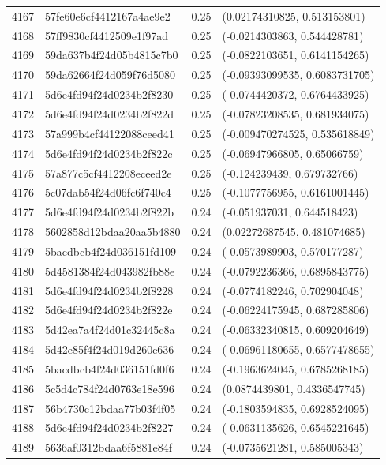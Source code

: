\begin{table}[ht]
\begin{tabular}{rlrl}
  4167 & 57fe60e6cf4412167a4ae9e2 & 0.25 & (0.02174310825, 0.513153801) \\ 
  4168 & 57ff9830cf4412509e1f97ad & 0.25 & (-0.0214303863, 0.544428781) \\ 
  4169 & 59da637b4f24d05b4815c7b0 & 0.25 & (-0.0822103651, 0.6141154265) \\ 
  4170 & 59da62664f24d059f76d5080 & 0.25 & (-0.09393099535, 0.6083731705) \\ 
  4171 & 5d6e4fd94f24d0234b2f8230 & 0.25 & (-0.0744420372, 0.6764433925) \\ 
  4172 & 5d6e4fd94f24d0234b2f822d & 0.25 & (-0.07823208535, 0.681934075) \\ 
  4173 & 57a999b4cf44122088ceed41 & 0.25 & (-0.009470274525, 0.535618849) \\ 
  4174 & 5d6e4fd94f24d0234b2f822c & 0.25 & (-0.06947966805, 0.65066759) \\ 
  4175 & 57a877c5cf4412208eceed2e & 0.25 & (-0.124239439, 0.679732766) \\ 
  4176 & 5c07dab54f24d06fc6f740c4 & 0.25 & (-0.1077756955, 0.6161001445) \\ 
  4177 & 5d6e4fd94f24d0234b2f822b & 0.24 & (-0.051937031, 0.644518423) \\ 
  4178 & 5602858d12bdaa20aa5b4880 & 0.24 & (0.02272687545, 0.481074685) \\ 
  4179 & 5bacdbcb4f24d036151fd109 & 0.24 & (-0.0573989903, 0.570177287) \\ 
  4180 & 5d4581384f24d043982fb88e & 0.24 & (-0.0792236366, 0.6895843775) \\ 
  4181 & 5d6e4fd94f24d0234b2f8228 & 0.24 & (-0.0774182246, 0.702904048) \\ 
  4182 & 5d6e4fd94f24d0234b2f822e & 0.24 & (-0.06224175945, 0.687285806) \\ 
  4183 & 5d42ea7a4f24d01c32445c8a & 0.24 & (-0.06332340815, 0.609204649) \\ 
  4184 & 5d42e85f4f24d019d260e636 & 0.24 & (-0.06961180655, 0.6577478655) \\ 
  4185 & 5bacdbcb4f24d036151fd0f6 & 0.24 & (-0.1963624045, 0.6785268185) \\ 
  4186 & 5c5d4c784f24d0763e18e596 & 0.24 & (0.0874439801, 0.4336547745) \\ 
  4187 & 56b4730c12bdaa77b03f4f05 & 0.24 & (-0.1803594835, 0.6928524095) \\ 
  4188 & 5d6e4fd94f24d0234b2f8227 & 0.24 & (-0.0631135626, 0.6545221645) \\ 
  4189 & 5636af0312bdaa6f5881e84f & 0.24 & (-0.0735621281, 0.585005343) \\ 

\end{tabular}
\end{table}
